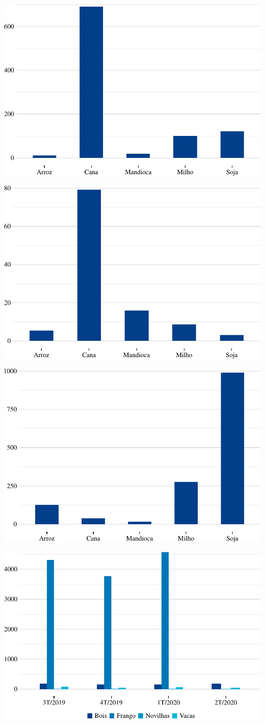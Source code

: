 \includegraphics{fig/producao-1.pdf}

\includegraphics{fig/rendim_medio-1.pdf}

\includegraphics{fig/area_plantada-1.pdf}

\includegraphics{fig/abates-1.pdf}
